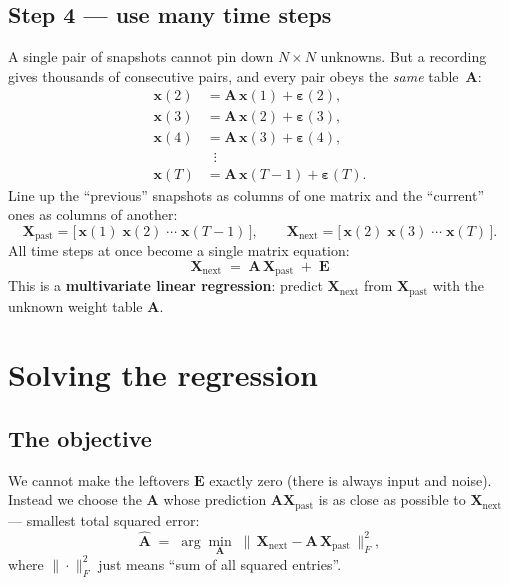 \documentclass[11pt,a4paper]{article}
\newcommand{\xx}{\mathbf{x}}
\newcommand{\Amat}{\mathbf{A}}
\newcommand{\eps}{\boldsymbol{\varepsilon}}
\newcommand{\Xp}{\mathbf{X}_{\text{past}}}
\newcommand{\Xn}{\mathbf{X}_{\text{next}}}
\begin{document}
\subsection{Step 4 --- use many time steps}
A single pair of snapshots cannot pin down $N\times N$ unknowns. But a recording
gives thousands of consecutive pairs, and every pair obeys the \emph{same}
table~$\Amat$:
\[
\begin{aligned}
\xx(2) &= \Amat\,\xx(1) + \eps(2),\\
\xx(3) &= \Amat\,\xx(2) + \eps(3),\\
\xx(4) &= \Amat\,\xx(3) + \eps(4),\\
&\;\;\vdots\\
\xx(T) &= \Amat\,\xx(T{-}1) + \eps(T).
\end{aligned}
\]
Line up the ``previous'' snapshots as columns of one matrix and the ``current''
ones as columns of another:
\[
\Xp=\big[\,\xx(1)\;\xx(2)\;\cdots\;\xx(T{-}1)\,\big],\qquad
\Xn=\big[\,\xx(2)\;\xx(3)\;\cdots\;\xx(T)\,\big].
\]
All time steps at once become a single matrix equation:
\begin{equation}
\boxed{\;\Xn \;=\; \Amat\,\Xp \;+\; \mathbf{E}\;}
\label{eq:matrixform}
\end{equation}
This is a \textbf{multivariate linear regression}: predict $\Xn$ from $\Xp$ with
the unknown weight table $\Amat$.

\section{Solving the regression}
\label{sec:solve}

\subsection{The objective}
We cannot make the leftovers $\mathbf{E}$ exactly zero (there is always input and
noise). Instead we choose the $\Amat$ whose prediction $\Amat\Xp$ is as close as
possible to $\Xn$ --- smallest total squared error:
\begin{equation}
\widehat{\Amat} \;=\; \arg\min_{\Amat}\; \big\|\,\Xn - \Amat\,\Xp\,\big\|_F^2 ,
\label{eq:ols}
\end{equation}
where $\|\cdot\|_F^2$ just means ``sum of all squared entries''.
\end{document}

